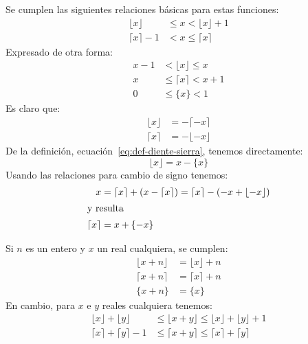   Se cumplen las siguientes relaciones básicas%
  para estas funciones:
  \begin{align}
    \label{eq:cotas-floor}
    \lfloor x \rfloor	&\le x	   <   \lfloor x \rfloor + 1 \\
    \label{eq:cotas-ceil}
    \lceil x \rceil - 1 &<   x	   \le \lceil x \rceil
  \end{align}
  Expresado de otra forma:
  \begin{align}
    \label{eq:cotas-floor-2}
    x - 1 &<   \lfloor x \rfloor \le x	   \\
    \label{eq:cotas-ceil-2}
    x	  &\le \lceil x \rceil	 <   x + 1 \\
    \label{eq:cotas-diente-sierra}
    0	  &\le \{x\}		 < 1
  \end{align}
  Es claro que:
  \begin{align}
    \label{eq:ceil-negativo}
    \lfloor x \rfloor
      &= -\lceil -x \rceil \\
    \label{eq:floor-negativo}
    \lceil x \rceil
      &= -\lfloor -x \rfloor
  \end{align}
  De la definición,
  ecuación~\eqref{eq:def-diente-sierra},
  tenemos directamente:
  \begin{equation}
    \label{eq:floor-diente-sierra}
    \lfloor x \rfloor
      = x - \{ x \}
  \end{equation}
  Usando las relaciones para cambio de signo
  tenemos:
  \begin{align}
    x
      &= \lceil x \rceil + (x - \lceil x \rceil)
       = \lceil x \rceil - (- x + \lfloor -x \rfloor )	\notag \\
  \intertext{y resulta}
    \lceil x \rceil
      &= x + \{ -x \}  \label{eq:ceil-diente-sierra}
  \end{align}

  Si \(n\) es un entero y \(x\) un real cualquiera,
  se cumplen:
  \begin{align}
    \label{eq:floor-real+int}
    \lfloor x + n \rfloor
      &= \lfloor x \rfloor + n \\
    \label{eq:ceil-real+int}
    \lceil x + n \rceil
      &= \lceil x \rceil + n \\
    \{ x + n \}
      &= \{ x \}
  \end{align}
  En cambio,
  para \(x\) e \(y\) reales cualquiera tenemos:
  \begin{align}
    \label{eq:floor-sum}
    \lfloor x \rfloor + \lfloor y \rfloor
      &\le \lfloor x + y \rfloor
       \le \lfloor x \rfloor + \lfloor y \rfloor + 1 \\
    \label{eq:ceil-sum}
    \lceil x \rceil + \lceil y \rceil -1
      &\le \lceil x + y \rceil
       \le \lceil x \rceil + \lceil y \rceil
  \end{align}

